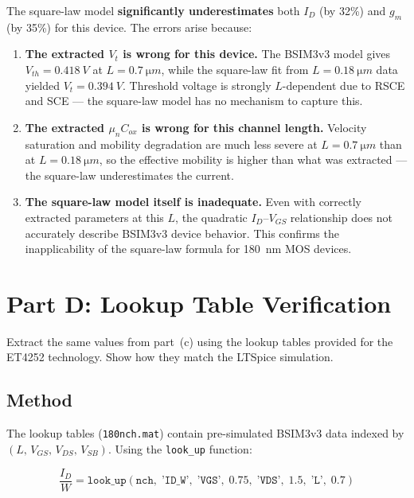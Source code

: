 \documentclass{article}
\begin{document}
The square-law model \textbf{significantly underestimates} both $I_D$ (by 32\%) and $g_m$ (by 35\%) for this device. The errors arise because:

\begin{enumerate}
\item \textbf{The extracted $V_t$ is wrong for this device.} The BSIM3v3 model gives $V_{th} = \SI{0.418}{V}$ at $L = \SI{0.7}{\micro m}$, while the square-law fit from $L = \SI{0.18}{\micro m}$ data yielded $V_t = \SI{0.394}{V}$. Threshold voltage is strongly $L$-dependent due to RSCE and SCE --- the square-law model has no mechanism to capture this.

\item \textbf{The extracted $\mu_n C_{ox}$ is wrong for this channel length.} Velocity saturation and mobility degradation are much less severe at $L = \SI{0.7}{\micro m}$ than at $L = \SI{0.18}{\micro m}$, so the effective mobility is higher than what was extracted --- the square-law underestimates the current.

\item \textbf{The square-law model itself is inadequate.} Even with correctly extracted parameters at this $L$, the quadratic $I_D$--$V_{GS}$ relationship does not accurately describe BSIM3v3 device behavior. This confirms the inapplicability of the square-law formula for \SI{180}{nm} MOS devices.
\end{enumerate}

\section{Part D: Lookup Table Verification}

Extract the same values from part~(c) using the lookup tables provided for the ET4252 technology. Show how they match the LTSpice simulation.

\subsection{Method}

The lookup tables (\texttt{180nch.mat}) contain pre-simulated BSIM3v3 data indexed by $(L,\, V_{GS},\, V_{DS},\, V_{SB})$. Using the \texttt{look\_up} function:

\begin{equation}
\frac{I_D}{W} = \texttt{look\_up}\!\left(\texttt{nch},\; \texttt{'ID\_W'},\; \texttt{'VGS'},\; 0.75,\; \texttt{'VDS'},\; 1.5,\; \texttt{'L'},\; 0.7\right)
\end{equation}
\end{document}
